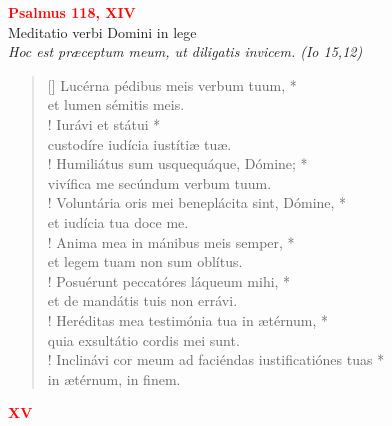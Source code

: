 


\def\greinitialformat#1{%
{\fontsize{39}{39}\selectfont #1}%
}




\vspace{0.3cm}
\begin{center}
 \textcolor{red}{\large \bf Psalmus 118, XIV}\\
Meditatio verbi Domini in lege\\
\textit{\small Hoc est præceptum meum, ut diligatis invicem. (Io 15,12)}
\end{center}
\begin{verse}[\versewidth]
Lucérna pédibus meis verbum tuum, *\\
et lumen sémitis meis.\\!
\vin Iurávi et státui *\\
\vin custodíre iudícia iustítiæ tuæ.\\!
Humiliátus sum usquequáque, Dómine; *\\
vivífica me secúndum verbum tuum.\\!
\vin Voluntária oris mei beneplácita sint, Dómine, *\\
\vin et iudícia tua doce me.\\!
Anima mea in mánibus meis semper, *\\
et legem tuam non sum oblítus.\\!
\vin Posuérunt peccatóres láqueum mihi, *\\
\vin et de mandátis tuis non errávi.\\!
Heréditas mea testimónia tua in ætérnum, *\\
quia exsultátio cordis mei sunt.\\!
\vin Inclinávi cor meum ad faciéndas iustificatiónes tuas *\\
\vin in ætérnum, in finem.\\
\end{verse}
\begin{center}
\textcolor{red}{\bf XV}\\
\end{center}
